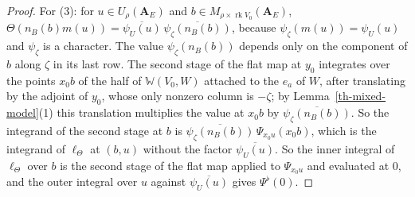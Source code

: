 \begin{proof}
For (3): for $u\in U_\rho(\mathbf A_E)$ and $b\in M_{\rho\times\operatorname{rk}V_0}(\mathbf A_E)$,
$\Theta(n_B(b)m(u))=\overline{\psi_U(u)}\,\overline{\psi_\zeta(n_B(b))}$, because
$\psi_\zeta(m(u))=\psi_U(u)$ and $\psi_\zeta$ is a character. The value
$\psi_\zeta(n_B(b))$ depends only on the component of $b$ along $\zeta$ in its
last row. The second stage of the flat map at $y_0$ integrates over the points
$x_0b$ of the half of $\mathbb W(V_0,W)$ attached to the $e_a$ of $W$, after
translating by the adjoint of $y_0$, whose only nonzero column is $-\zeta$; by
Lemma~\ref{th-mixed-model}(1) this translation multiplies the value at $x_0b$
by $\overline{\psi_\zeta(n_B(b))}$. So the integrand of the second stage at $b$
is $\overline{\psi_\zeta(n_B(b))}\,\Psi_{x_0u}(x_0b)$, which is the integrand of
$\ell_\Theta$ at $(b,u)$ without the factor $\overline{\psi_U(u)}$.
So the inner integral of $\ell_\Theta$ over $b$ is the second stage of the flat
map applied to $\Psi_{x_0u}$ and evaluated at $0$, and the outer integral over
$u$ against $\overline{\psi_U(u)}$ gives $\Psi^\flat(0)$.
\end{proof}

